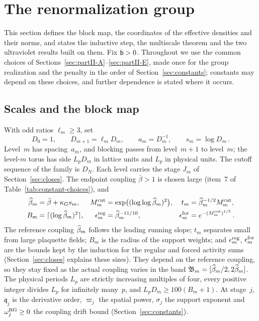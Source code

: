 
\section{The renormalization group}\label{sec:renormalization}

This section defines the block map, the coordinates of the effective densities and their norms, and states the inductive step, the multiscale theorem and the two ultraviolet results built on them. Fix $\mathsf{b}>0$. Throughout we use the common choices of Sections~\ref{sec:partII-A}--\ref{sec:partII-E}, made once for the group realization and the penalty in the order of Section~\ref{sec:constants}; constants may depend on these choices, and further dependence is stated where it occurs.

\subsection{Scales and the block map}\label{sec:block-map}

With odd ratios $\ell_m\ge3$, set
\begin{equation}\label{eq:I12-levels}
D_0=1,\qquad D_{m+1}=\ell_mD_m,\qquad a_m=D_m^{-1},\qquad s_m=\log D_m\,.
\end{equation}
Level~$m$ has spacing~$a_m$, and blocking passes from level~$m+1$ to level~$m$; the level-$m$ torus has side $L_pD_m$ in lattice units and $L_p$ in physical units. The cutoff sequence of the family is $D_N$. Each level carries the stage $J_m$ of Section~\ref{sec:closes}. The endpoint coupling $\bar\beta>1$ is chosen large (item~7 of Table~\ref{tab:constant-choices}), and
\begin{align}\label{eq:I12-scales}
\widehat{\beta}_m&=\bar\beta+\kappa_G s_m,&
M^{\mathrm{cut}}_m&=\exp\bigl((\log\log\widehat{\beta}_m)^2\bigr),&
t_m&=\widehat{\beta}_m^{-1/2}M^{\mathrm{cut}}_m,\\
B_m&=\lceil(\log\widehat{\beta}_m)^2\rceil,&
\epsilon_m^{\rm reg}&=\widehat{\beta}_m^{-11/10},&
\epsilon_m^{\rm for}&=e^{-(M^{\mathrm{cut}}_m)^{1/5}}\,.\label{eq:I12-scales-b}
\end{align}
The reference coupling $\widehat{\beta}_m$ follows the leading running slope; $t_m$ separates small from large plaquette fields; $B_m$ is the radius of the support weights; and $\epsilon_m^{\rm reg}$, $\epsilon_m^{\rm for}$ are the bounds kept by the induction for the regular and forced activity sums (Section~\ref{sec:closes} explains these sizes). They depend on the reference coupling, so they stay fixed as the actual coupling varies in the band $\mathfrak B_m=[\widehat{\beta}_m/2,2\widehat{\beta}_m]$. The physical periods $L_p$ are strictly increasing multiples of four, every positive integer divides $L_p$ for infinitely many~$p$, and $L_pD_m\ge100(B_m+1)$. At stage~$j$, $\mathfrak q_j$ is the derivative order, $\varpi_j$ the spatial power, $\sigma_j$ the support exponent and $\omega_j^{\rm RG}\ge0$ the coupling drift bound (Section~\ref{sec:constants}).

